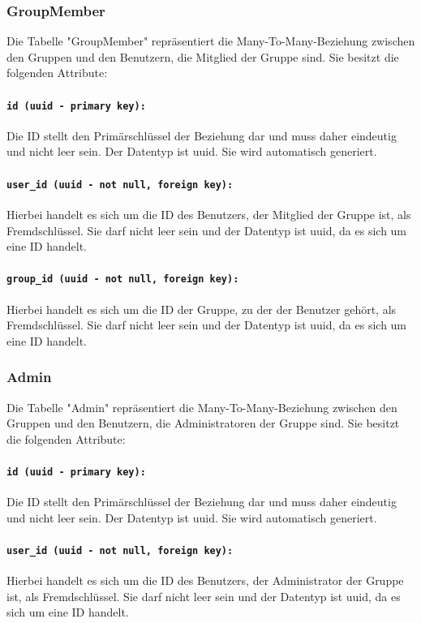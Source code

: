 \documentclass{entwurfsheft}
\begin{document}
\begin{sloppypar}
\subsubsection{GroupMember}
Die Tabelle "GroupMember" repräsentiert die Many-To-Many-Beziehung zwischen den Gruppen und den Benutzern, die Mitglied der Gruppe sind. Sie besitzt die folgenden Attribute:
\paragraph{\texttt{id (uuid - primary key):}} Die ID stellt den Primärschlüssel der Beziehung dar und muss daher eindeutig und nicht leer sein. Der Datentyp ist \Gls{uuid}. Sie wird automatisch generiert.
\paragraph{\texttt{user\_id (uuid - not null, foreign key):}} Hierbei handelt es sich um die ID des Benutzers, der Mitglied der Gruppe ist, als Fremdschlüssel. Sie darf nicht leer sein und der Datentyp ist \Gls{uuid}, da es sich um eine ID handelt.
\paragraph{\texttt{group\_id (uuid - not null, foreign key):}} Hierbei handelt es sich um die ID der Gruppe, zu der der Benutzer gehört, als Fremdschlüssel. Sie darf nicht leer sein und der Datentyp ist \Gls{uuid}, da es sich um eine ID handelt.
\newpage
\subsubsection{Admin}
Die Tabelle "Admin" repräsentiert die Many-To-Many-Beziehung zwischen den Gruppen und den Benutzern, die Administratoren der Gruppe sind. Sie besitzt die folgenden Attribute:
\paragraph{\texttt{id (uuid - primary key):}} Die ID stellt den Primärschlüssel der Beziehung dar und muss daher eindeutig und nicht leer sein. Der Datentyp ist \Gls{uuid}. Sie wird automatisch generiert.
\paragraph{\texttt{user\_id (uuid - not null, foreign key):}} Hierbei handelt es sich um die ID des Benutzers, der Administrator der Gruppe ist, als Fremdschlüssel. Sie darf nicht leer sein und der Datentyp ist \Gls{uuid}, da es sich um eine ID handelt.

\end{sloppypar}
\end{document}
